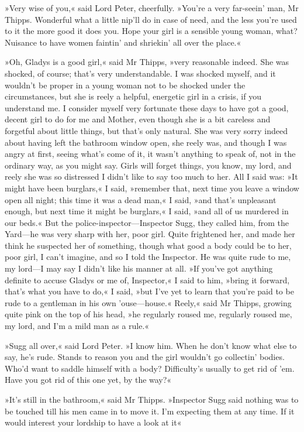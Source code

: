 »Very wise of you,« said Lord Peter, cheerfully. »You're a very far-seein' man, Mr Thipps. Wonderful what a little nip'll do in case of need, and the less you're used to it the more good it does you. Hope your girl is a sensible young woman, what? Nuisance to have women faintin' and shriekin' all over the place.«

»Oh, Gladys is a good girl,« said Mr Thipps, »very reasonable indeed. She was shocked, of course; that's very understandable. I was shocked myself, and it wouldn't be proper in a young woman not to be shocked under the circumstances, but she is reely a helpful, energetic girl in a crisis, if you understand me. I consider myself very fortunate these days to have got a good, decent girl to do for me and Mother, even though she is a bit careless and forgetful about little things, but that's only natural. She was very sorry indeed about having left the bathroom window open, she reely was, and though I was angry at first, seeing what's come of it, it wasn't anything to speak of, not in the ordinary way, as you might say. Girls will forget things, you know, my lord, and reely she was so distressed I didn't like to say too much to her. All I said was: »It might have been burglars,« I said, »remember that, next time you leave a window open all night; this time it was a dead man,« I said, »and that's unpleasant enough, but next time it might be burglars,« I said, »and all of us murdered in our beds.« But the police-inspector—Inspector Sugg, they called him, from the Yard—he was very sharp with her, poor girl. Quite frightened her, and made her think he suspected her of something, though what good a body could be to her, poor girl, I can't imagine, and so I told the Inspector. He was quite rude to me, my lord—I may say I didn't like his manner at all. »If you've got anything definite to accuse Gladys or me of, Inspector,« I said to him, »bring it forward, that's what you have to do,« I said, »but I've yet to learn that you're paid to be rude to a gentleman in his own 'ouse—house.« Reely,« said Mr Thipps, growing quite pink on the top of his head, »he regularly roused me, regularly roused me, my lord, and I'm a mild man as a rule.«

»Sugg all over,« said Lord Peter. »I know him. When he don't know what else to say, he's rude. Stands to reason you and the girl wouldn't go collectin' bodies. Who'd want to saddle himself with a body? Difficulty's usually to get rid of 'em. Have you got rid of this one yet, by the way?«

»It's still in the bathroom,« said Mr Thipps. »Inspector Sugg said nothing was to be touched till his men came in to move it. I'm expecting them at any time. If it would interest your lordship to have a look at it\longdash«

